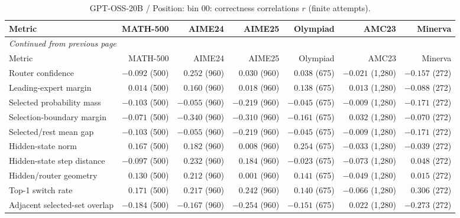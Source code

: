 \begingroup\scriptsize\setlength{\tabcolsep}{4pt}
\begin{longtable}{@{}lrrrrrr@{}}
\caption{GPT-OSS-20B / Position: bin 00: correctness correlations $r$ (finite attempts).}\label{tab:multi-gptoss-position-bin_00}\\
\toprule
Metric & MATH-500 & AIME24 & AIME25 & Olympiad & AMC23 & Minerva \\
\midrule\endfirsthead
\multicolumn{7}{l}{\textit{Continued from previous page}}\\
\toprule
Metric & MATH-500 & AIME24 & AIME25 & Olympiad & AMC23 & Minerva \\
\midrule\endhead
\bottomrule\endfoot
Router confidence & $-0.092$ (500) & $0.252$ (960) & $0.030$ (960) & $0.038$ (675) & $-0.021$ (1,280) & $-0.157$ (272) \\
Leading-expert margin & $0.014$ (500) & $0.160$ (960) & $0.018$ (960) & $0.138$ (675) & $0.013$ (1,280) & $-0.088$ (272) \\
Selected probability mass & $-0.103$ (500) & $-0.055$ (960) & $-0.219$ (960) & $-0.045$ (675) & $-0.009$ (1,280) & $-0.171$ (272) \\
Selection-boundary margin & $-0.071$ (500) & $-0.340$ (960) & $-0.310$ (960) & $-0.161$ (675) & $0.032$ (1,280) & $-0.070$ (272) \\
Selected/rest mean gap & $-0.103$ (500) & $-0.055$ (960) & $-0.219$ (960) & $-0.045$ (675) & $-0.009$ (1,280) & $-0.171$ (272) \\
Hidden-state norm & $0.167$ (500) & $0.182$ (960) & $0.008$ (960) & $0.254$ (675) & $-0.033$ (1,280) & $-0.039$ (272) \\
Hidden-state step distance & $-0.097$ (500) & $0.232$ (960) & $0.184$ (960) & $-0.023$ (675) & $-0.073$ (1,280) & $0.048$ (272) \\
Hidden/router geometry & $0.130$ (500) & $0.212$ (960) & $0.001$ (960) & $0.141$ (675) & $-0.049$ (1,280) & $0.015$ (272) \\
Top-1 switch rate & $0.171$ (500) & $0.217$ (960) & $0.242$ (960) & $0.140$ (675) & $-0.066$ (1,280) & $0.306$ (272) \\
Adjacent selected-set overlap & $-0.184$ (500) & $-0.167$ (960) & $-0.254$ (960) & $-0.151$ (675) & $0.022$ (1,280) & $-0.273$ (272) \\
\end{longtable}\endgroup

